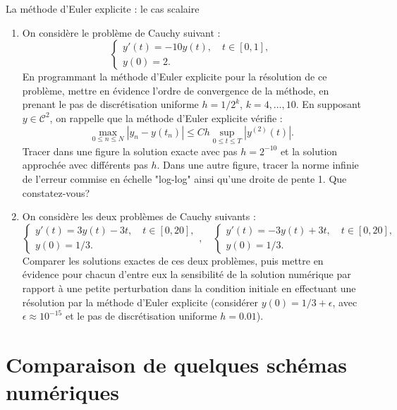 \documentclass[a4paper,12pt,reqno]{amsart}
\begin{document}
\begin{exo} La m\'ethode d'Euler explicite : le cas scalaire
\begin{enumerate}
\item
On consid\`ere le probl\`eme de Cauchy suivant :
$$
\left\{
\begin{array}{lcl}
y'(t)=-10y(t), \quad t \in [0,1], \\
y(0)=2.
\end{array}
\right.
$$
En programmant la m\'ethode d'Euler explicite pour la r\'esolution de ce probl\`eme, mettre en \'evidence l'ordre de convergence de la m\'ethode, en prenant le pas de discr\'etisation uniforme $h=1/2^k$, $k=4,\dots,10$. 
En supposant $y \in {\mathcal{C}}^{2}$, on rappelle que la m\'ethode d'Euler explicite v\'erifie :
$$
\max_{0 \leq n \leq N} |y_n-y(t_n)|\leq C h \sup_{0 \leq t \leq T} |y^{(2)}(t)|.
$$
Tracer dans une figure la solution exacte avec pas $h=2^{-10}$ et la solution approch\'ee avec diff\'erents pas $h$.
Dans une autre figure, tracer la norme infinie de l'erreur commise en \'echelle "log-log" ainsi qu'une droite de pente 1. 
Que constatez-vous?
\item
On consid\`ere les deux probl\`emes de Cauchy suivants :
$$
\left\{
\begin{array}{lcl}
y'(t)=3y(t)-3t, \quad t \in [0,20], \\
y(0)=1/3.
\end{array}
\right.
, \quad 
\left\{
\begin{array}{lcl}
y'(t)=-3y(t)+3t, \quad t \in [0,20], \\
y(0)=1/3.
\end{array}
\right.
$$
Comparer les solutions exactes de ces deux probl\`emes, puis mettre en \'evidence  pour chacun d'entre eux la sensibilit\'e de la solution num\'erique par rapport \`a une petite perturbation dans la condition initiale en effectuant une r\'esolution par la m\'ethode d'Euler explicite (consid\'erer $y(0)= 1/3 + \epsilon$, avec $\epsilon \approx 10^{-15}$ et le pas de discr\'etisation uniforme $h=0.01$).
\end{enumerate}
\end{exo}

\section{Comparaison  de quelques sch\'emas num\'eriques}
\end{document}
